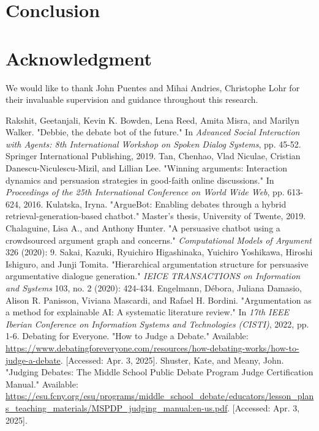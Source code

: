 \documentclass[conference]{IEEEtran}
\begin{document}
\section{Conclusion}

\section*{Acknowledgment}
We would like to thank John Puentes and Mihai Andries, Christophe Lohr for their invaluable supervision and guidance throughout this research.

\begin{thebibliography}{00}
     Rakshit, Geetanjali, Kevin K. Bowden, Lena Reed, Amita Misra, and Marilyn Walker. "Debbie, the debate bot of the future." In \textit{Advanced Social Interaction with Agents: 8th International Workshop on Spoken Dialog Systems}, pp. 45-52. Springer International Publishing, 2019.
     Tan, Chenhao, Vlad Niculae, Cristian Danescu-Niculescu-Mizil, and Lillian Lee. "Winning arguments: Interaction dynamics and persuasion strategies in good-faith online discussions." In \textit{Proceedings of the 25th International Conference on World Wide Web}, pp. 613-624, 2016.
     Kulatska, Iryna. "ArgueBot: Enabling debates through a hybrid retrieval-generation-based chatbot." Master's thesis, University of Twente, 2019.
     Chalaguine, Lisa A., and Anthony Hunter. "A persuasive chatbot using a crowdsourced argument graph and concerns." \textit{Computational Models of Argument} 326 (2020): 9.
     Sakai, Kazuki, Ryuichiro Higashinaka, Yuichiro Yoshikawa, Hiroshi Ishiguro, and Junji Tomita. "Hierarchical argumentation structure for persuasive argumentative dialogue generation." \textit{IEICE TRANSACTIONS on Information and Systems} 103, no. 2 (2020): 424-434.
     Engelmann, Débora, Juliana Damasio, Alison R. Panisson, Viviana Mascardi, and Rafael H. Bordini. "Argumentation as a method for explainable AI: A systematic literature review." In \textit{17th IEEE Iberian Conference on Information Systems and Technologies (CISTI)}, 2022, pp. 1-6.
     Debating for Everyone. "How to Judge a Debate." Available: \url{https://www.debatingforeveryone.com/resources/how-debating-works/how-to-judge-a-debate}. [Accessed: Apr. 3, 2025].
     Shuster, Kate, and Meany, John. "Judging Debates: The Middle School Public Debate Program Judge Certification Manual." Available: \url{https://esu.fcny.org/esu/programs/middle_school_debate/educators/lesson_plans_teaching_materials/MSPDP_judging_manual:en-us.pdf}. [Accessed: Apr. 3, 2025].

\end{thebibliography}
\end{document}
